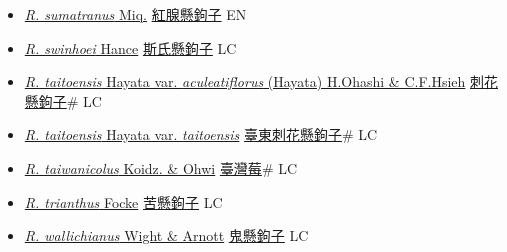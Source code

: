 \begin{itemize}
\begin{itemize}
        \item[] \href{http://www.theplantlist.org/tpl1.1/search?q=Rubus+sumatranus}{\textit{R. sumatranus} Miq.}   \href{\detokenize{http://taibnet.sinica.edu.tw/chi/taibnet_species_list.php?T2=紅腺懸鉤子&T2_new_value=true&fr=y}}{紅腺懸鉤子} EN
        \item[] \href{http://www.theplantlist.org/tpl1.1/search?q=Rubus+swinhoei}{\textit{R. swinhoei} Hance}   \href{\detokenize{http://taibnet.sinica.edu.tw/chi/taibnet_species_list.php?T2=斯氏懸鉤子&T2_new_value=true&fr=y}}{斯氏懸鉤子} LC
        \item[] \href{http://www.theplantlist.org/tpl1.1/search?q=Rubus+taitoensis+var.+aculeatiflorus}{\textit{R. taitoensis} Hayata var. \textit{aculeatiflorus} (Hayata) H.Ohashi \& C.F.Hsieh}   \href{\detokenize{http://taibnet.sinica.edu.tw/chi/taibnet_species_list.php?T2=刺花懸鉤子&T2_new_value=true&fr=y}}{刺花懸鉤子}\# LC
        \item[] \href{http://www.theplantlist.org/tpl1.1/search?q=Rubus+taitoensis+var.+taitoensis}{\textit{R. taitoensis} Hayata var. \textit{taitoensis}}   \href{\detokenize{http://taibnet.sinica.edu.tw/chi/taibnet_species_list.php?T2=臺東刺花懸鉤子&T2_new_value=true&fr=y}}{臺東刺花懸鉤子}\# LC
        \item[] \href{http://www.theplantlist.org/tpl1.1/search?q=Rubus+taiwanicolus}{\textit{R. taiwanicolus} Koidz. \& Ohwi}   \href{\detokenize{http://taibnet.sinica.edu.tw/chi/taibnet_species_list.php?T2=臺灣莓&T2_new_value=true&fr=y}}{臺灣莓}\# LC
        \item[] \href{http://www.theplantlist.org/tpl1.1/search?q=Rubus+trianthus}{\textit{R. trianthus} Focke}   \href{\detokenize{http://taibnet.sinica.edu.tw/chi/taibnet_species_list.php?T2=苦懸鉤子&T2_new_value=true&fr=y}}{苦懸鉤子} LC
        \item[] \href{http://www.theplantlist.org/tpl1.1/search?q=Rubus+wallichianus}{\textit{R. wallichianus} Wight \& Arnott}   \href{\detokenize{http://taibnet.sinica.edu.tw/chi/taibnet_species_list.php?T2=鬼懸鉤子&T2_new_value=true&fr=y}}{鬼懸鉤子} LC

\end{itemize}
\end{itemize}
